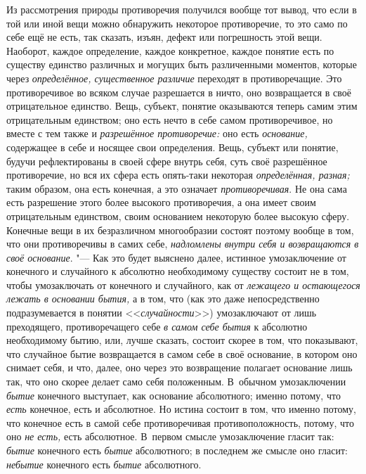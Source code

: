 Из рассмотрения природы противоречия получился вообще тот вывод, что если в
той или иной вещи можно обнаружить некоторое противоречие, то это само по
себе ещё не есть, так сказать, изъян, дефект или погрешность этой вещи.
Наоборот, каждое определение, каждое конкретное, каждое понятие есть по
существу единство различных и могущих быть различенными моментов, которые
через {\em определённое, существенное различие}
переходят в противоречащие. Это противоречивое во всяком случае разрешается
в ничто, оно возвращается в своё отрицательное единство. Вещь, субъект,
понятие оказываются теперь самим этим отрицательным единством; оно есть
нечто в себе самом противоречивое, но вместе с тем также и
{\em разрешённое противоречие:} оно есть
{\em основание,} содержащее в себе и носящее свои
определения. Вещь, субъект или понятие, будучи рефлектированы в своей сфере
внутрь себя, суть своё разрешённое противоречие, но вся их сфера есть
опять-таки некоторая {\em определённая, разная;} таким
образом, она есть конечная, а это означает
{\em противоречивая}. Не она сама есть разрешение этого
более высокого противоречия, а она имеет своим отрицательным единством,
своим основанием некоторую более высокую сферу. Конечные вещи в их
безразличном многообразии состоят поэтому вообще в том, что они
противоречивы в самих себе, {\em надломлены внутри себя
и возвращаются в своё основание}. "--- Как это будет выяснено далее, истинное
умозаключение от конечного и случайного к абсолютно необходимому существу
состоит не в том, чтобы умозаключать от конечного и случайного, как от
{\em лежащего и остающегося лежать в основании бытия,}
а в том, что (как это даже непосредственно подразумевается в понятии
<<{\em случайности}>>) умозаключают от лишь преходящего,
противоречащего себе {\em в самом себе бытия} к
абсолютно необходимому бытию, или, лучше сказать, состоит скорее в том, что
показывают, что случайное бытие возвращается в самом себе в своё основание,
в котором оно снимает себя, и что, далее, оно через это возвращение
полагает основание лишь так, что оно скорее делает само себя положенным.
В~обычном умозаключении {\em бытие} конечного выступает,
как основание абсолютного; именно потому, что
{\em есть} конечное, есть и абсолютное. Но истина
состоит в том, что именно потому, что конечное есть в самой себе
противоречивая противоположность, потому, что оно
{\em не есть,} есть абсолютное. В~первом смысле
умозаключение гласит так: {\em бытие} конечного есть
{\em бытие} абсолютного; в последнем же смысле оно
гласит: {\em небытие} конечного есть {\em бытие} абсолютного.
